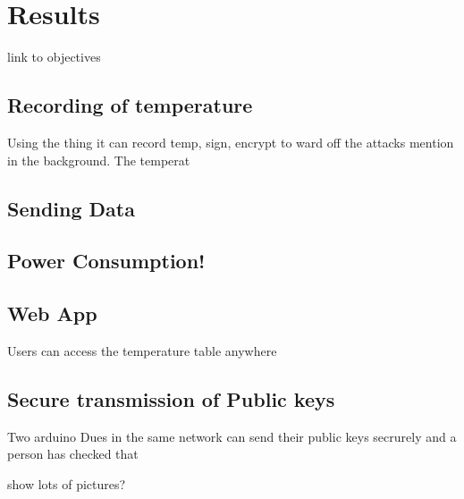 \chapter{Results}
\label{res}

link to objectives

\section{Recording of temperature}

Using the thing it can record temp, sign, encrypt to ward off the attacks mention in the background. The temperat

\section{Sending Data}

\section{Power Consumption!}

\section{Web App}

Users can access the temperature table anywhere 

\section{Secure transmission of Public keys}

Two arduino Dues in the same network can send their public keys secrurely and a person has checked that

show lots of pictures?